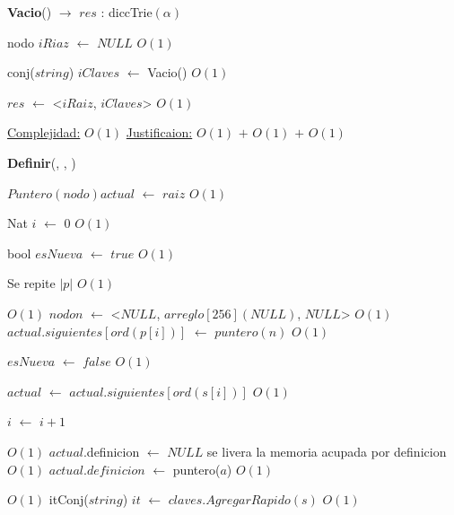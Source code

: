 \begin{Algoritmos}
  
  
\begin{algorithm}[H]
{\textbf{Vacio}() $\to$ $res$ : diccTrie$(\alpha)$}
\begin{algorithmic}[1]

\State nodo $iRiaz$ $\gets $ $NULL$  \Comment $O(1)$
 
\State conj($string$) $iClaves$ $\gets$ Vacio() \Comment $O(1)$

\State $res$ $\gets$ <$iRaiz$, $iClaves$> \Comment $O(1)$

\medskip
\State \underline{Complejidad:} $O(1)$
\State \underline{Justificaion:} $O(1)$ $+$ $O(1)$ $+$ $O(1)$

\end{algorithmic}
\end{algorithm}
  

\begin{algorithm}[H]
{\textbf{Definir}(, , )}
\begin{algorithmic}[1]

\State $Puntero(nodo) actual$ $\gets$ $raiz$ \Comment $O(1)$

\State Nat $i$ $\gets$ $0$ \Comment $O(1)$

\State bool $esNueva$ $\gets$ $true$ \Comment $O(1)$

   \Comment Se repite $|p|$ $O(1)$
	
	
	 \Comment $O(1)$
		\State $nodo n$ $\gets$ <$NULL$, $arreglo[256](NULL)$, $NULL$> \Comment $O(1)$
		\State $actual.siguientes[ord(p[i])]$ $\gets$		 $puntero(n)$ \Comment $O(1)$
		
		\State $esNueva$ $\gets$ $false$ \Comment $O(1)$	 
	
	\EndIf
	
	\State $actual$ $\gets$ $actual.siguientes[ord(s[i])]$ \Comment $O(1)$

	\State $i$ $\gets$ $i + 1$
\EndWhile 

 \Comment $O(1)$
	\State $actual$.definicion $\gets$ $NULL$ \Comment se livera la memoria acupada por definicion $O(1)$
\EndIf
\State $actual$.$definicion$ $\gets$ puntero($a$) \Comment $O(1)$

 \Comment $O(1)$
	\State itConj($string$) $it$ $\gets$  $claves.AgregarRapido(s)$ \Comment $O(1)$
	

\end{algorithmic}
\end{algorithm}
\end{Algoritmos}
